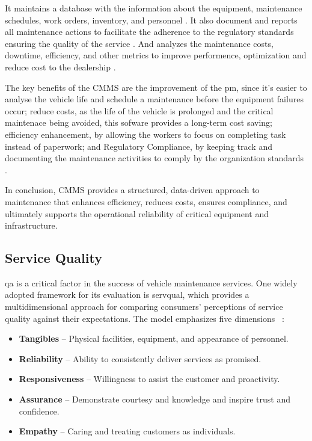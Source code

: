 It maintains a database with the information about the equipment, maintenance schedules, work orders, inventory, and personnel \cite{inbook}. 
It also document and reports all maintenance actions to facilitate the adherence to the regulatory standards ensuring the quality of the service \cite{Ibm_2025a}. 
And analyzes the maintenance costs, downtime, efficiency, and other metrics to improve performence, optimization and reduce cost to the dealership \cite{Accruent_2025}.

The key benefits of the \ac{CMMS} are the improvement of the \acs{pm}, since it's easier to analyse the vehicle life and schedule a maintenance before the equipment failures occur; reduce costs, as the life of the vehicle is prolonged and the critical maintenace being avoided, this sofware provides a long-term cost saving; efficiency enhancement, by allowing the workers to focus on completing task instead of paperwork; and Regulatory Compliance, by keeping track and documenting the maintenance activities to comply by the organization standards \cite{Aptean_2023}. 

In conclusion, \ac{CMMS} provides a structured, data-driven approach to maintenance that enhances efficiency, reduces costs, ensures compliance, and ultimately supports the operational reliability of critical equipment and infrastructure.





\subsection{Service Quality}

\acs{qa} is a critical factor in the success of vehicle maintenance services. One widely adopted framework for its evaluation is \ac{servqual}, which provides a multidimensional approach for comparing consumers' perceptions of service quality against their expectations. The model emphasizes five dimensions ~\cite{SERVQUAL_OLD}:


\begin{itemize}
   \item \textbf{Tangibles} – Physical facilities, equipment, and appearance of personnel.
   \item \textbf{Reliability} – Ability to consistently deliver services as promised.
   \item \textbf{Responsiveness} – Willingness to assist the customer and proactivity.
   \item \textbf{Assurance} – Demonstrate courtesy and knowledge and inspire trust and confidence.
   \item \textbf{Empathy} – Caring and treating customers as individuals.
  \end{itemize}

